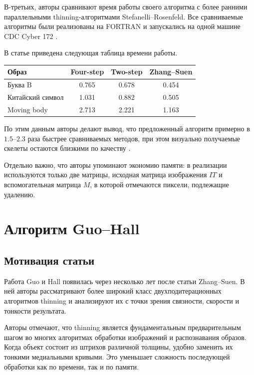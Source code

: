 \documentclass[12pt,a4paper]{article}
\begin{document}
	В-третьих, авторы сравнивают время работы своего алгоритма с более ранними параллельными thinning-алгоритмами Stefanelli--Rosenfeld. Все сравниваемые алгоритмы были реализованы на FORTRAN и запускались на одной машине CDC Cyber 172 \cite{zhang1984}.
	
	В статье приведена следующая таблица времени работы.
	
	\begin{center}
		\begin{tabular}{lccc}
			\toprule
			Образ & Four-step & Two-step & Zhang--Suen \\
			\midrule
			Буква B & 0.765 & 0.678 & 0.454 \\
			Китайский символ & 1.031 & 0.882 & 0.505 \\
			Moving body & 2.713 & 2.221 & 1.163 \\
			\bottomrule
		\end{tabular}
	\end{center}
	
	По этим данным авторы делают вывод, что предложенный алгоритм примерно в $1.5$--$2.3$ раза быстрее сравниваемых методов, при этом визуально получаемые скелеты остаются близкими по качеству \cite{zhang1984}.
	
	Отдельно важно, что авторы упоминают экономию памяти: в реализации используются только две матрицы, исходная матрица изображения $IT$ и вспомогательная матрица $M$, в которой отмечаются пиксели, подлежащие удалению.
	
	\section{Алгоритм Guo--Hall}
	
	\subsection{Мотивация статьи}
	
	Работа Guo и Hall \cite{guo1989} появилась через несколько лет после статьи Zhang--Suen. В ней авторы рассматривают более широкий класс двухподитерационных алгоритмов thinning и анализируют их с точки зрения связности, скорости и тонкости результата.
	
	Авторы отмечают, что thinning является фундаментальным предварительным шагом во многих алгоритмах обработки изображений и распознавания образов. Когда объект состоит из штрихов различной толщины, удобно заменить их тонкими медиальными кривыми. Это уменьшает сложность последующей обработки как по времени, так и по памяти.
	
\end{document}
